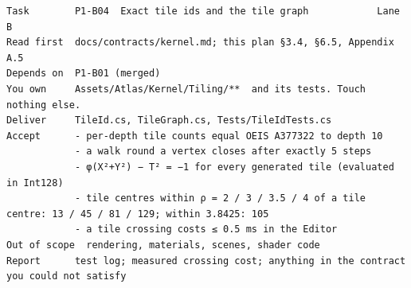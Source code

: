 \documentclass[10pt,a4paper,landscape]{article}
\begin{document}
\begin{Verbatim}[fontsize=\footnotesize,frame=none,xleftmargin=2mm]
Task        P1-B04  Exact tile ids and the tile graph            Lane B
Read first  docs/contracts/kernel.md; this plan §3.4, §6.5, Appendix A.5
Depends on  P1-B01 (merged)
You own     Assets/Atlas/Kernel/Tiling/**  and its tests. Touch nothing else.
Deliver     TileId.cs, TileGraph.cs, Tests/TileIdTests.cs
Accept      - per-depth tile counts equal OEIS A377322 to depth 10
            - a walk round a vertex closes after exactly 5 steps
            - φ(X²+Y²) − T² = −1 for every generated tile (evaluated in Int128)
            - tile centres within ρ = 2 / 3 / 3.5 / 4 of a tile centre: 13 / 45 / 81 / 129; within 3.8425: 105
            - a tile crossing costs ≤ 0.5 ms in the Editor
Out of scope  rendering, materials, scenes, shader code
Report      test log; measured crossing cost; anything in the contract you could not satisfy
\end{Verbatim}
\end{document}
